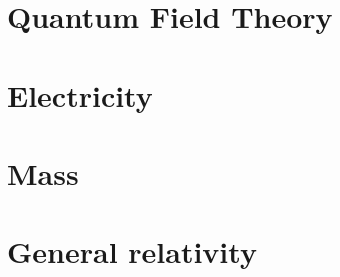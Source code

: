 


\section{Quantum Field Theory}


\section{Electricity}

\section{Mass}

\section{General relativity}



